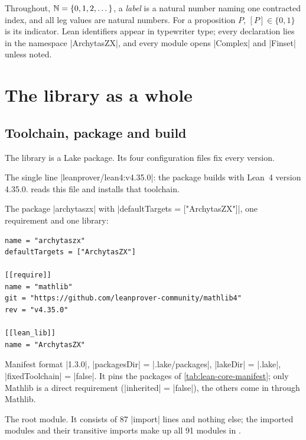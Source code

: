 Throughout, $\mathbb{N}=\{0,1,2,\dots\}$, a \emph{label} is a natural number naming one contracted index,
and all leg values are natural numbers. For a proposition $P$, $[P]\in\{0,1\}$ is its indicator.
Lean identifiers appear in typewriter type; every declaration lies in the namespace
\lean|ArchytasZX|, and every module opens \lean|Complex| and \lean|Finset| unless noted.

\section{The library as a whole}\label{sec:lean-core-library}

\subsection{Toolchain, package and build}\label{sec:lean-core-build}

The library is a Lake package. Its four configuration files fix every version.

\begin{description}[style=nextline]
\item[\file{lean-toolchain}] The single line \code|leanprover/lean4:v4.35.0|: the package builds
  with Lean~4 version 4.35.0. 
  reads this file and installs that toolchain.
\item[\file{lakefile.toml}] The package \code|archytaszx| with \code|defaultTargets = ["ArchytasZX"]|,
  one requirement and one library:
\begin{lstlisting}[style=grammar]
name = "archytaszx"
defaultTargets = ["ArchytasZX"]

[[require]]
name = "mathlib"
git = "https://github.com/leanprover-community/mathlib4"
rev = "v4.35.0"

[[lean_lib]]
name = "ArchytasZX"
\end{lstlisting}
\item[\file{lake-manifest.json}] Manifest format \code|1.3.0|, \code|packagesDir| =
  \code|.lake/packages|, \code|lakeDir| = \code|.lake|, \code|fixedToolchain| = \code|false|. It pins
  the packages of \cref{tab:lean-core-manifest}; only Mathlib is a direct requirement
  (\code|inherited| = \code|false|), the others come in through Mathlib.
\item[\file{ArchytasZX.lean}] The root module. It consists of 87 \lean|import| lines and nothing
  else; the imported modules and their transitive imports make up all 91 modules in
  .
\end{description}

